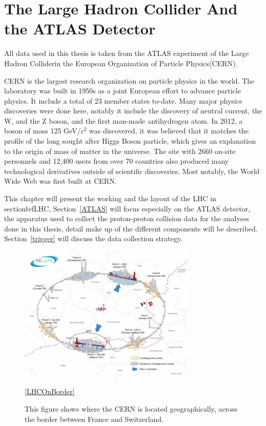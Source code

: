 \chapter{The Large Hadron Collider And the ATLAS Detector}
\label{chapter:ATLAS}

All data used in this thesis is taken from the ATLAS experiment of the Large Hadron Colliderin the European Organization of Particle Physics(CERN).

CERN is the largest research organization on particle physics in the world. The laboratory was built in 1950s as a joint European effort to advance particle physics. It include a total of 23 member states to-date. Many major physics discoveries were done here, notably it include the discovery of neutral current, the W, and the Z boson, and the first man-made antihydrogen atom. In 2012, a boson of mass 125 GeV/$c^{2}$ was discovered, it was believed that it matches the profile of the long sought after Higgs Boson particle, which gives an explanation to the origin of mass of matter in the universe. The site with 2660 on-site personnels and 12,400 users from over 70 countries also produced many technological derivatives outside of scientific discoveries. Most notably, the World Wide Web was first built at CERN.

This chapter will present the working and the layout of the LHC in section\~ref{LHC}, Section~\ref{ATLAS} will focus especially on the ATLAS detector, the apparatus used to collect the proton-proton collision data for the analyses done in this thesis, detail make up of the different components will be described. Section~\ref{trigger} will discuss the data collection strategy.

\begin{figure}[!htb]
    \begin{center}
        \includegraphics[width=0.75\textwidth]{figures/chapter_ATLAS/LHCOnBorder}
        \caption{
			This figure shows where the CERN is located geographically, across the border between France and Switzerland. \cite{Brüning:782076} 
        }
        \label{fig:CERNAcceleratorComplex}
        \ref{LHCOnBorder}
    \end{center}
\end{figure}

